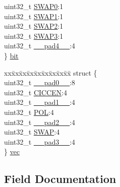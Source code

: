 \begin{DoxyCompactItemize}
\begin{tabbing}
\>uint32\_t \mbox{\hyperlink{union_t_c_c___w_a_v_e___type_a99ff2a9276fb2e4c3e5023cf62d1478f}{SWAP0}}:1\\
\>uint32\_t \mbox{\hyperlink{union_t_c_c___w_a_v_e___type_a56b0c6cba2d80a42217f373cae9c48e9}{SWAP1}}:1\\
\>uint32\_t \mbox{\hyperlink{union_t_c_c___w_a_v_e___type_a2c81e5e1be53b191af39d429de0c3900}{SWAP2}}:1\\
\>uint32\_t \mbox{\hyperlink{union_t_c_c___w_a_v_e___type_aedd9f25a7427259ed7f2cd3d97f6a215}{SWAP3}}:1\\
\>uint32\_t \mbox{\hyperlink{union_t_c_c___w_a_v_e___type_a7b2edc85d90e34c4435951e1e5c59517}{\_\_pad4\_\_}}:4\\
\} \mbox{\hyperlink{union_t_c_c___w_a_v_e___type_a0b8b2320e7fdb4255645724a0c513de5}{bit}}\\

\end{tabbing}\item 
\begin{tabbing}
xx\=xx\=xx\=xx\=xx\=xx\=xx\=xx\=xx\=\kill
struct \{\\
\>uint32\_t \mbox{\hyperlink{union_t_c_c___w_a_v_e___type_a3e57c2ef1c3ffb36722f000cc1156824}{\_\_pad0\_\_}}:8\\
\>uint32\_t \mbox{\hyperlink{union_t_c_c___w_a_v_e___type_a71aedd7f86e1334220a13a922b389a75}{CICCEN}}:4\\
\>uint32\_t \mbox{\hyperlink{union_t_c_c___w_a_v_e___type_a6712ba6dd1d5b43d2d56ff8ac4e275a7}{\_\_pad1\_\_}}:4\\
\>uint32\_t \mbox{\hyperlink{union_t_c_c___w_a_v_e___type_a94e771ff08371c784734957626561bc2}{POL}}:4\\
\>uint32\_t \mbox{\hyperlink{union_t_c_c___w_a_v_e___type_a9ce12a63de64ef64ae2d59d128251cae}{\_\_pad2\_\_}}:4\\
\>uint32\_t \mbox{\hyperlink{union_t_c_c___w_a_v_e___type_a1b62068dd035ccd5f17ab503f8c2ac66}{SWAP}}:4\\
\>uint32\_t \mbox{\hyperlink{union_t_c_c___w_a_v_e___type_a4854608c0e776f0704a4d9a4b98ea57d}{\_\_pad3\_\_}}:4\\
\} \mbox{\hyperlink{union_t_c_c___w_a_v_e___type_a490645dcdb361cdf5130c5b9d509cf43}{vec}}\\

\end{tabbing}\end{DoxyCompactItemize}


\subsection{Field Documentation}
\mbox{\label{union_t_c_c___w_a_v_e___type_a3e57c2ef1c3ffb36722f000cc1156824}} 

